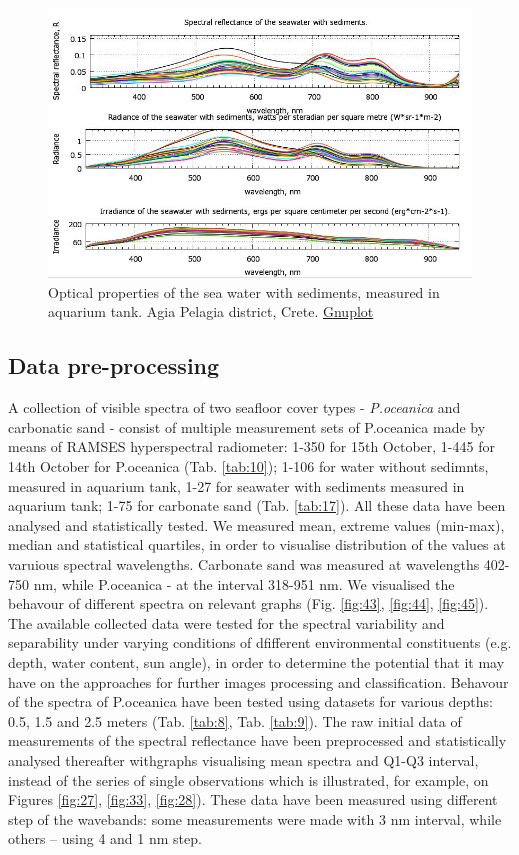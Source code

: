 \documentclass[10pt, a4paper]{article}
\begin{document}
\begin{figure}[h]
	\centering
	\includegraphics[scale=0.5]{GNU-17.jpg}
	\caption{Optical properties of the sea water with sediments, measured in aquarium tank. Agia Pelagia district, Crete. \href{http://www.gnuplot.info/}{Gnuplot}}
	\label{fig:23}
\end{figure}
\pagebreak

\subsection{Data pre-processing}
A collection of visible spectra of two seafloor cover types - \textit{P.oceanica} and carbonatic sand - consist of multiple measurement sets of P.oceanica made by means of RAMSES hyperspectral radiometer: 1-350 for 15th October, 1-445 for 14th October for P.oceanica (Tab. \ref{tab:10}); 1-106 for water without sedimnts, measured in aquarium tank, 1-27 for seawater with sediments measured in aquarium tank; 1-75 for carbonate sand (Tab. \ref{tab:17}). All these data have been analysed and statistically tested. We measured mean, extreme values (min-max), median and statistical quartiles, in order to visualise distribution of the values at varuious spectral wavelengths. Carbonate sand was measured at wavelengths 402-750 nm, while P.oceanica - at the interval 318-951 nm. We visualised the behavour of different spectra on relevant graphs (Fig. \ref{fig:43}, \ref{fig:44}, \ref{fig:45}). 
The available collected data were tested for the spectral variability and separability under varying conditions of dfifferent environmental
constituents (e.g. depth, water content, sun angle), in order to determine the
potential that it may have on the approaches for further images processing and classification. Behavour of the spectra of P.oceanica have been tested using datasets for various depths: 0.5, 1.5 and 2.5 meters (Tab. \ref{tab:8}, Tab. \ref{tab:9}). The raw
initial data of measurements of the spectral reflectance have been preprocessed and statistically analysed thereafter withgraphs visualising mean spectra and Q1-Q3 interval, instead of the series of single observations which is illustrated, for example, on Figures \ref{fig:27}, \ref{fig:33}, \ref{fig:28}). These data
have been measured using different step of the wavebands: some measurements
were made with 3 nm interval, while others – using 4 and 1 nm step.
\end{document}
